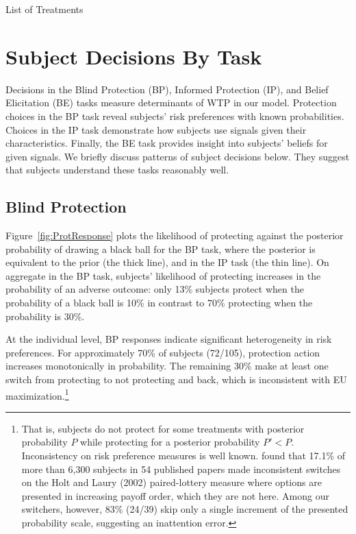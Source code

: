 \documentclass[12pt,a4paper]{article}
\begin{document}
\begin{table}[h!]
\caption{List of Treatments} \label{tab:treatments}

\end{table}


 


\vspace{20pt}
\section{Subject Decisions By Task}\label{sec:sanity}

Decisions in the Blind Protection (BP), Informed Protection (IP), and Belief Elicitation (BE) tasks measure determinants of WTP in our model. Protection choices in the BP task reveal subjects' risk preferences with known probabilities. Choices in the IP task demonstrate how subjects use signals given their characteristics. Finally, the BE task provides insight into subjects' beliefs for given signals.  We briefly discuss patterns of subject decisions below. They suggest that subjects understand these tasks reasonably well.

\subsection{Blind Protection}

Figure~\ref{fig:ProtResponse} plots the likelihood of protecting against the posterior probability of drawing a black ball for the BP task, where the posterior is equivalent to the prior (the thick line), and in the IP task (the thin line). On aggregate in the BP task, subjects' likelihood of protecting increases in the probability of an adverse outcome: only 13\% subjects protect when the probability of a black ball is 10\% in contrast to 70\% protecting when the probability is 30\%. 

At the individual level, BP responses indicate significant heterogeneity in risk preferences. For approximately 70\% of subjects (72/105), protection action increases monotonically in probability. The remaining 30\% make at least one switch from protecting to not protecting and back, which is inconsistent with EU maximization.\footnote{That is, subjects do not protect for some treatments with posterior probability $P$ while protecting for a posterior probability $P'<P$.  Inconsistency on risk preference measures is well known.  \citet{filippin_reconsideration_2016} found that 17.1\% of more than 6,300 subjects in 54 published papers made inconsistent switches on the Holt and Laury (2002) paired-lottery measure where options are presented in increasing payoff order, which they are not here. Among our switchers, however, 83\% (24/39) skip only a single increment of the presented probability scale, suggesting an inattention error.}
\end{document}
